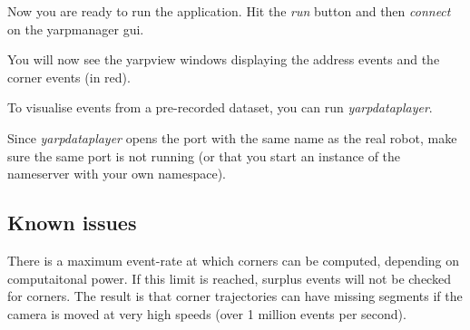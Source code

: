 Now you are ready to run the application. Hit the {\itshape run} button and then {\itshape connect} on the yarpmanager gui.

You will now see the yarpview windows displaying the address events and the corner events (in red).

To visualise events from a pre-\/recorded dataset, you can run {\itshape yarpdataplayer}.

Since {\itshape yarpdataplayer} opens the port with the same name as the real robot, make sure the same port is not running (or that you start an instance of the nameserver with your own namespace).

\subsection*{Known issues}


\begin{DoxyItemize}
\item There is a maximum event-\/rate at which corners can be computed, depending on computaitonal power. If this limit is reached, surplus events will not be checked for corners. The result is that corner trajectories can have missing segments if the camera is moved at very high speeds (over 1 million events per second). 
\end{DoxyItemize}